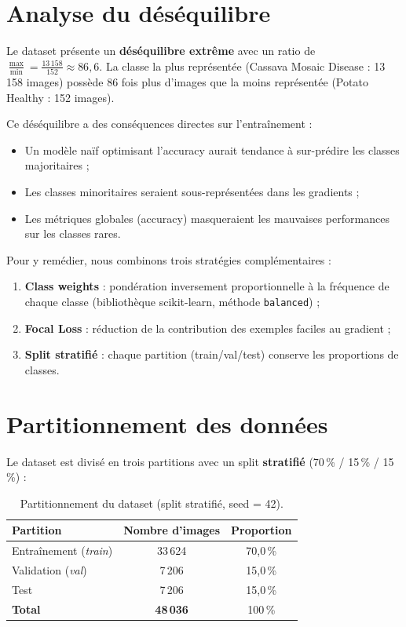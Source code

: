 \documentclass[12pt, a4paper, twoside]{report}
\begin{document}
\section{Analyse du déséquilibre}

Le dataset présente un \textbf{déséquilibre extrême} avec un ratio de $\frac{\max}{\min} = \frac{13\,158}{152} \approx 86{,}6$. La classe la plus représentée (Cassava Mosaic Disease : 13\,158 images) possède 86 fois plus d'images que la moins représentée (Potato Healthy : 152 images).

Ce déséquilibre a des conséquences directes sur l'entraînement :
\begin{itemize}
    \item Un modèle naïf optimisant l'accuracy aurait tendance à sur-prédire les classes majoritaires ;
    \item Les classes minoritaires seraient sous-représentées dans les gradients ;
    \item Les métriques globales (accuracy) masqueraient les mauvaises performances sur les classes rares.
\end{itemize}

Pour y remédier, nous combinons trois stratégies complémentaires :
\begin{enumerate}
    \item \textbf{Class weights} : pondération inversement proportionnelle à la fréquence de chaque classe (bibliothèque scikit-learn, méthode \texttt{balanced}) ;
    \item \textbf{Focal Loss} : réduction de la contribution des exemples faciles au gradient ;
    \item \textbf{Split stratifié} : chaque partition (train/val/test) conserve les proportions de classes.
\end{enumerate}

\section{Partitionnement des données}

Le dataset est divisé en trois partitions avec un split \textbf{stratifié} (70\,\% / 15\,\% / 15\,\%) :

\begin{table}[H]
\centering
\caption{Partitionnement du dataset (split stratifié, seed = 42).}
\label{tab:split}
\begin{tabular}{lcc}
\toprule
\textbf{Partition} & \textbf{Nombre d'images} & \textbf{Proportion} \\
\midrule
Entraînement (\textit{train}) & 33\,624 & 70,0\,\% \\
Validation (\textit{val})     & 7\,206  & 15,0\,\% \\
Test                          & 7\,206  & 15,0\,\% \\
\midrule
\textbf{Total}                & \textbf{48\,036} & 100\,\% \\
\bottomrule
\end{tabular}
\end{table}
\end{document}
